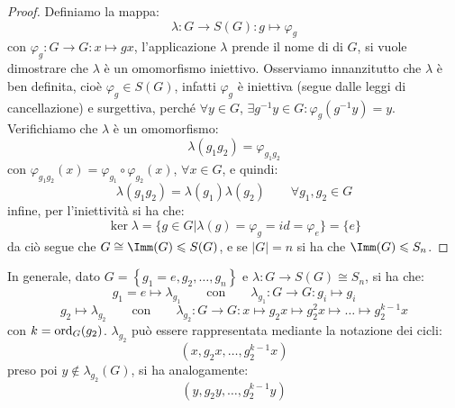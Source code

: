 \documentclass[11pt]{scrartcl}
\begin{document}
\begin{proof}
    Definiamo la mappa:
        \[ \lambda : G \longrightarrow S(G) : g \longmapsto \varphi_g
            \]
    con $\varphi_g : G \longrightarrow G : x \longmapsto gx$, l'applicazione $\lambda$ prende il nome di  di $G$, si 
    vuole dimostrare che $\lambda$ è un omomorfismo iniettivo.
    Osserviamo innanzitutto che $\lambda$ è ben definita, cioè $\varphi_g \in S(G)$, infatti $\varphi_g$ è iniettiva (segue dalle leggi di cancellazione) e 
    surgettiva, perché $\forall y \in G$, $\exists g^{-1}y \in G : \varphi_g(g^{-1}y) = y$. Verifichiamo che $\lambda$ è un omomorfismo:
        \[ \lambda(g_1g_2) = \varphi_{g_1g_2}
            \]
    con $\varphi_{g_1g_2} (x) = \varphi_{g_1} \circ \varphi_{g_2} (x)$, $\forall x \in G$, e quindi:
        \[ \lambda(g_1g_2) = \lambda(g_1) \lambda(g_2)
        \qquad \forall g_1,g_2 \in G
            \]
    infine, per l'iniettività si ha che:
        \[ \ker \lambda = \{g \in G | \lambda(g) = \varphi_g = id = \varphi_e\} = \{e\}
            \]
    da ciò segue che $G \cong \Imm(G) \leqslant S(G)$, e se $|G| = n$ si ha che $\Imm(G) \leqslant S_n$.
\end{proof}

\begin{remark}
    In generale, dato $G = \left\{g_1 = e,g_2, \ldots, g_n\right\}$ e $\lambda : G \longrightarrow S(G) \cong S_n$, si ha che:
        \[ g_1 = e \longmapsto \lambda_{g_1} \qquad \text{con} \qquad \lambda_{g_1}: G \longrightarrow G : g_i \longmapsto g_i
            \]
        \[ g_2 \longmapsto \lambda_{g_2} \qquad \text{con} \qquad \lambda_{g_2} : G \longrightarrow G : x \longmapsto g_2x \longmapsto g_2^2x \longmapsto \ldots \longmapsto g_2^{k-1}x
            \]
        con $k = \operatorname{ord}_G(g_2)$. $\lambda_{g_2}$ può essere rappresentata mediante la notazione dei cicli:
            \[ (x,g_2x,\ldots,g_2^{k-1}x)
                \]
        preso poi $y \not\in \lambda_{g_2}(G)$, si ha analogamente:
        \[ (y,g_2y,\ldots,g_2^{k-1}y)
            \]
\end{remark}
\end{document}
